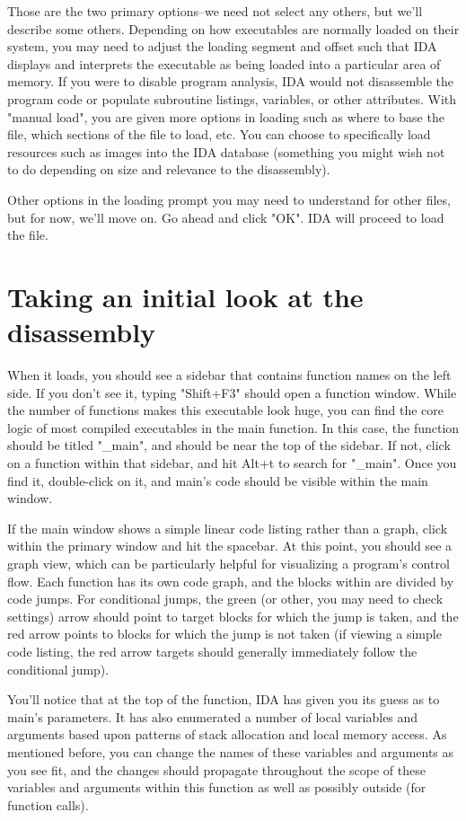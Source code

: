 \documentclass[11pt]{article}
\begin{document}
Those are the two primary options--we need not select any others, but we'll
describe some others. Depending on how executables are normally loaded on
their system, you may need to adjust the loading segment and offset such that 
IDA displays and interprets the executable as being loaded into a particular
area of memory. If you were to disable program analysis, IDA would not 
disassemble the program code or populate subroutine listings, variables, or
other attributes. With "manual load", you are given more options in loading
such as where to base the file, which sections of the file to load, etc. You
can choose to specifically load resources such as images into the IDA database
(something you might wish not to do depending on size and relevance to the
disassembly).

Other options in the loading prompt you may need to understand for other
files, but for now, we'll move on. Go ahead and click "OK". IDA will proceed
to load the file.

\section{Taking an initial look at the disassembly}
\label{sec-4}
When it loads, you should see a sidebar that contains function names on the
left side. If you don't see it, typing "Shift+F3" should open a function
window. While the number of functions makes this executable look huge, you can
find the core logic of most compiled executables in the main function. In this
case, the function should be titled "\_main", and should be near the top of
the sidebar. If not, click on a function within that sidebar, and hit Alt+t to
search for "\_main". Once you find it, double-click on it, and main's code
should be visible within the main window.

If the main window shows a simple linear code listing rather than a graph,
click within the primary window and hit the spacebar. At this point, you
should see a graph view, which can be particularly helpful for visualizing a
program's control flow. Each function has its own code graph, and the blocks
within are divided by code jumps. For conditional jumps, the green (or other,
you may need to check settings) arrow should point to target blocks for which
the jump is taken, and the red arrow points to blocks for which the jump is
not taken (if viewing a simple code listing, the red arrow targets should
generally immediately follow the conditional jump).

You'll notice that at the top of the function, IDA has given you its guess as
to main's parameters. It has also enumerated a number of local variables and
arguments based upon patterns of stack allocation and local memory access. As
mentioned before, you can change the names of these variables and arguments as
you see fit, and the changes should propagate throughout the scope of these
variables and arguments within this function as well as possibly outside (for
function calls).
\end{document}
